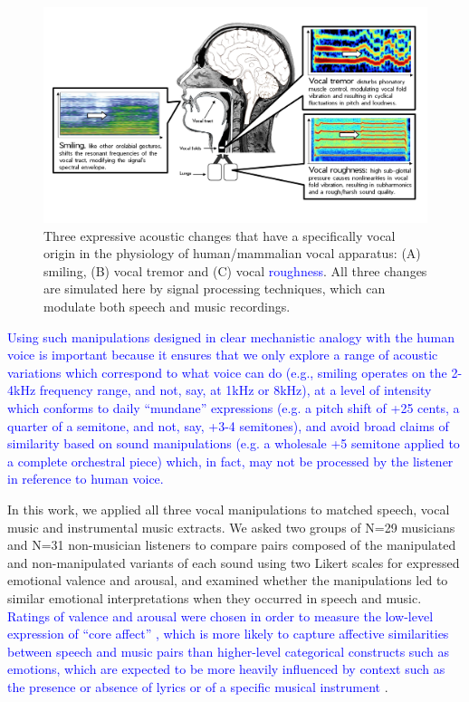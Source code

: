 \documentclass[openacc]{rsprocb_new}%
\begin{document}
\begin{figure}[htbp]
\centerline{\includegraphics[width=\textwidth]{pics/Figure_1.jpg}}
\caption{Three expressive acoustic changes that have a specifically vocal origin in the physiology of human/mammalian vocal apparatus: (A) smiling, (B) vocal tremor and (C) vocal \textcolor{blue}{roughness}. All three changes are simulated here by signal processing techniques, which can modulate both speech and music recordings. }
\label{effects}
\end{figure}

\textcolor{blue}{Using such manipulations designed in clear mechanistic analogy with the human voice is important because it ensures that we only explore a range of acoustic variations which correspond to what voice can do (e.g., smiling operates on the 2-4kHz frequency range, and not, say, at 1kHz or 8kHz), at a level of intensity which conforms to daily ``mundane'' expressions (e.g. a pitch shift of +25 cents, a quarter of a semitone, and not, say, +3-4 semitones), and avoid broad claims of similarity based on sound manipulations (e.g. a wholesale +5 semitone applied to a complete orchestral piece) which, in fact, may not be processed by the listener in reference to human voice.}  

In this work, we applied all three vocal manipulations to matched speech, vocal music and instrumental music extracts. We asked two groups of N=29 musicians and N=31 non-musician listeners to compare pairs composed of the manipulated and non-manipulated variants of each sound using two Likert scales for expressed emotional valence and arousal, and examined whether the manipulations led to similar emotional interpretations when they occurred in speech and music. \textcolor{blue}{Ratings of valence and arousal were chosen in order to measure the low-level expression of ``core affect'' \cite{EKKE13}, which is more likely to capture affective similarities between speech and music pairs than higher-level categorical constructs such as emotions, which are expected to be more heavily influenced by context such as the presence or absence of lyrics \cite{BARR07} or of a specific musical instrument \cite{HAIL09}}.  
\end{document}
